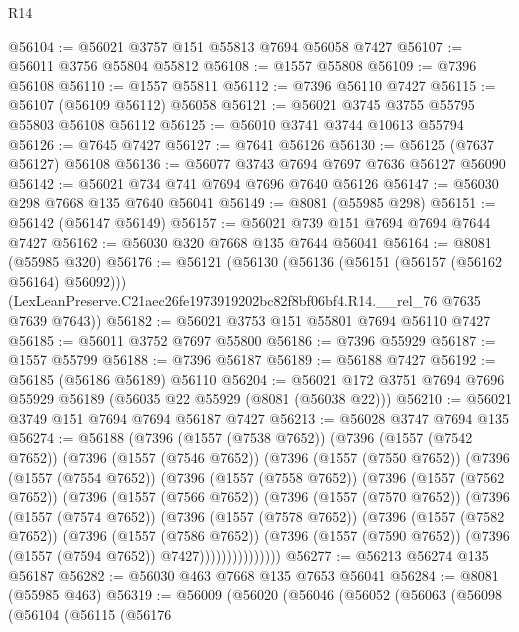 \begin{lexlean}{R14}
\begin{coremodule}
@56104 := @56021 @3757 @151 @55813 @7694 @56058 @7427
@56107 := @56011 @3756 @55804 @55812
@56108 := @1557 @55808
@56109 := @7396 @56108
@56110 := @1557 @55811
@56112 := @7396 @56110 @7427
@56115 := @56107 (@56109 @56112) @56058
@56121 := @56021 @3745 @3755 @55795 @55803 @56108 @56112
@56125 := @56010 @3741 @3744 @10613 @55794
@56126 := @7645 @7427
@56127 := @7641 @56126
@56130 := @56125 (@7637 @56127) @56108
@56136 := @56077 @3743 @7694 @7697 @7636 @56127 @56090
@56142 := @56021 @734 @741 @7694 @7696 @7640 @56126
@56147 := @56030 @298 @7668 @135 @7640 @56041
@56149 := @8081 (@55985 @298)
@56151 := @56142 (@56147 @56149)
@56157 := @56021 @739 @151 @7694 @7694 @7644 @7427
@56162 := @56030 @320 @7668 @135 @7644 @56041
@56164 := @8081 (@55985 @320)
@56176 := @56121
    (@56130
      (@56136 (@56151 (@56157 (@56162 @56164) @56092)))
      (LexLeanPreserve.C21aec26fe1973919202bc82f8bf06bf4.R14.__rel_76 @7635 @7639 @7643))
@56182 := @56021 @3753 @151 @55801 @7694 @56110 @7427
@56185 := @56011 @3752 @7697 @55800
@56186 := @7396 @55929
@56187 := @1557 @55799
@56188 := @7396 @56187
@56189 := @56188 @7427
@56192 := @56185 (@56186 @56189) @56110
@56204 := @56021 @172 @3751 @7694 @7696 @55929 @56189 (@56035 @22 @55929 (@8081 (@56038 @22)))
@56210 := @56021 @3749 @151 @7694 @7694 @56187 @7427
@56213 := @56028 @3747 @7694 @135
@56274 := @56188
    (@7396
      (@1557 (@7538 @7652))
      (@7396
        (@1557 (@7542 @7652))
        (@7396
          (@1557 (@7546 @7652))
          (@7396
            (@1557 (@7550 @7652))
            (@7396
              (@1557 (@7554 @7652))
              (@7396
                (@1557 (@7558 @7652))
                (@7396
                  (@1557 (@7562 @7652))
                  (@7396
                    (@1557 (@7566 @7652))
                    (@7396
                      (@1557 (@7570 @7652))
                      (@7396
                        (@1557 (@7574 @7652))
                        (@7396
                          (@1557 (@7578 @7652))
                          (@7396
                            (@1557 (@7582 @7652))
                            (@7396
                              (@1557 (@7586 @7652))
                              (@7396
                                (@1557 (@7590 @7652))
                                (@7396 (@1557 (@7594 @7652)) @7427)))))))))))))))
@56277 := @56213 @56274 @135 @56187
@56282 := @56030 @463 @7668 @135 @7653 @56041
@56284 := @8081 (@55985 @463)
@56319 := @56009
    (@56020
      (@56046
        (@56052
          (@56063
            (@56098
              (@56104
                (@56115
                  (@56176

\end{coremodule}
\end{lexlean}
